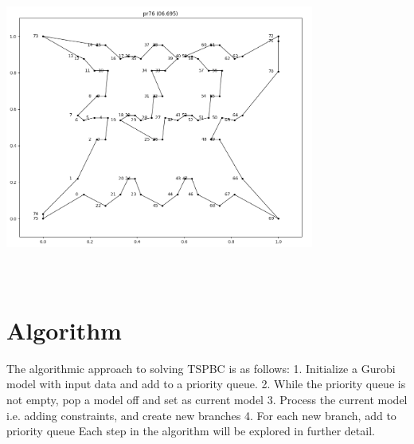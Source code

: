 \documentclass{article}
\begin{document}
\begin{flushleft}
\includegraphics[width=4in, height=4in]{pr76_optTour}

\end{flushleft}

\section{Algorithm}

The algorithmic approach to solving TSPBC is as follows:
1. Initialize a Gurobi model with input data and add to a priority queue.
2. While the priority queue is not empty, pop a model off and set as current model
3. Process the current model i.e. adding constraints, and create new branches
4. For each new branch, add to priority queue
Each step in the algorithm will be explored in further detail.
\end{document}
